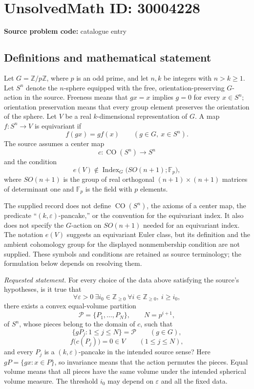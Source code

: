 \documentclass[11pt]{article}
\newcommand{\Z}{\mathbb{Z}}
\newcommand{\F}{\mathbb{F}}
\begin{document}
\section*{UnsolvedMath ID: 30004228}
\textbf{Source problem code:} catalogue entry
\subsection{Definitions and mathematical statement}
Let \(G=\Z/p\Z\), where \(p\) is an odd prime, and let \(n,k\) be integers with \(n>k\geq1\). Let \(S^n\) denote the \(n\)-sphere equipped with the free, orientation-preserving \(G\)-action in the source. Freeness means that \(gx=x\) implies \(g=0\) for every \(x\in S^n\); orientation preservation means that every group element preserves the orientation of the sphere. Let \(V\) be a real \(k\)-dimensional representation of \(G\). A map \(f:S^n\to V\) is equivariant if
\[
f(gx)=g f(x)\qquad(g\in G,\ x\in S^n).
\]
The source assumes a center map
\[
c:\operatorname{CO}(S^n)\longrightarrow S^n
\]
and the condition
\[
e(V)\notin\operatorname{Index}_{G}\bigl(SO(n+1);\F_p\bigr),
\]
where \(SO(n+1)\) is the group of real orthogonal \((n+1)\times(n+1)\) matrices of determinant one and \(\F_p\) is the field with \(p\) elements.

The supplied record does not define \(\operatorname{CO}(S^n)\), the axioms of a center map, the predicate ``\((k,\varepsilon)\)-pancake,'' or the convention for the equivariant index. It also does not specify the \(G\)-action on \(SO(n+1)\) needed for an equivariant index. The notation \(e(V)\) suggests an equivariant Euler class, but its definition and the ambient cohomology group for the displayed nonmembership condition are not supplied. These symbols and conditions are retained as source terminology; the formulation below depends on resolving them.

\emph{Requested statement.} For every choice of the data above satisfying the source's hypotheses, is it true that
\[
\forall\varepsilon>0\ \exists i_0\in\Z_{\geq0}\ \forall i\in\Z_{\geq0},\ i\geq i_0,
\]
there exists a convex equal-volume partition
\[
\mathcal P=\{P_1,\ldots,P_N\},\qquad N=p^{i+1},
\]
of \(S^n\), whose pieces belong to the domain of \(c\), such that
\[
\{gP_j:1\leq j\leq N\}=\mathcal P\qquad(g\in G),
\]
\[
f\bigl(c(P_j)\bigr)=0\in V\qquad(1\leq j\leq N),
\]
and every \(P_j\) is a \((k,\varepsilon)\)-pancake in the intended source sense? Here \(gP=\{gx:x\in P\}\), so invariance means that the action permutes the pieces. Equal volume means that all pieces have the same volume under the intended spherical volume measure. The threshold \(i_0\) may depend on \(\varepsilon\) and all the fixed data.
\end{document}
